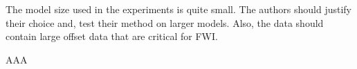 \begin{point}
	The model size used in the experiments is quite small. The authors should justify their choice and, test their method on larger models. Also, the data should contain large offset data that are critical for FWI.
\end{point}

\begin{reply}
	AAA
\end{reply}

